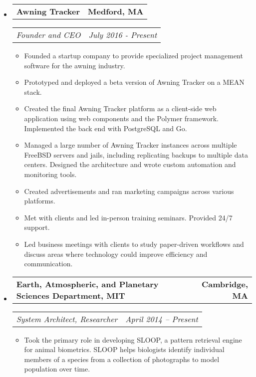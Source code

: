 \documentclass[10pt,letterpaper]{article}
\makeatletter
\newcommand{\headerrow}[2]
{\begin{tabular*}{\linewidth}{l@{\extracolsep{\fill}}r}
	#1 & #2 \\
\end{tabular*}}
\makeatother
\begin{document}
\begin{itemize}
	\parskip=0.1em

	\item
	\headerrow
		{\textbf{Awning Tracker}}
		{\textbf{Medford, MA}}
	\headerrow
		{\emph{Founder and CEO}}
        {\emph{July 2016 - Present}}
	\begin{itemize}
        \item Founded a startup company to provide specialized project
            management software for the awning industry.

        \item Prototyped and deployed a beta version of Awning Tracker on a
            MEAN stack.

        \item Created the final Awning Tracker platform as a client-side web
            application using web components and the Polymer framework.
            Implemented the back end with PostgreSQL and Go.

        \item Managed a large number of Awning Tracker instances across
            multiple FreeBSD servers and jails, including replicating backups
            to multiple data centers.  Designed the architecture and wrote
            custom automation and monitoring tools.

        \item Created advertisements and ran marketing campaigns across various
            platforms.

        \item Met with clients and led in-person training seminars.  Provided
            24/7 support.

        \item Led business meetings with clients to study paper-driven
            workflows and discuss areas where technology could improve
            efficiency and communication.
	\end{itemize}

    \item
    \headerrow
        {\textbf{Earth, Atmospheric, and Planetary Sciences Department, MIT}}
        {\textbf{Cambridge, MA}}
    \headerrow
        {\emph{System Architect, Researcher}}
        {\emph{April 2014 -- Present}}
    \begin{itemize}
        \item Took the primary role in developing SLOOP, a pattern retrieval
            engine for animal biometrics.  SLOOP helps biologists identify
            individual members of a species from a collection of photographs to
            model population over time.


\end{itemize}
\end{itemize}
\end{document}
